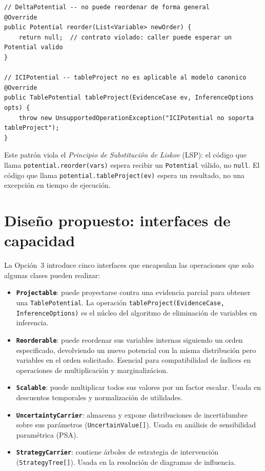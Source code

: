 \documentclass[11pt,a4paper]{article}
\newcommand{\code}[1]{\texttt{#1}}
\begin{document}
\begin{lstlisting}[caption={Implementación forzada en subclases que no pueden reordenar}]
// DeltaPotential -- no puede reordenar de forma general
@Override
public Potential reorder(List<Variable> newOrder) {
    return null;  // contrato violado: caller puede esperar un Potential valido
}

// ICIPotential -- tableProject no es aplicable al modelo canonico
@Override
public TablePotential tableProject(EvidenceCase ev, InferenceOptions opts) {
    throw new UnsupportedOperationException("ICIPotential no soporta tableProject");
}
\end{lstlisting}

Este patrón viola el \emph{Principio de Substitución de Liskov} (LSP): el
código que llama \code{potential.reorder(vars)} espera recibir un \code{Potential}
válido, no \code{null}.  El código que llama \code{potential.tableProject(ev)}
espera un resultado, no una excepción en tiempo de ejecución.

\section{Diseño propuesto: interfaces de capacidad}
\label{sec:op3-propuesta}

La Opción~3 introduce cinco interfaces que encapsulan las operaciones que solo
algunas clases pueden realizar:

\begin{itemize}
  \item \textbf{\code{Projectable}}: puede proyectarse contra una evidencia
        parcial para obtener una \code{TablePotential}.  La operación
        \code{tableProject(EvidenceCase, InferenceOptions)} es el núcleo del
        algoritmo de eliminación de variables en inferencia.

  \item \textbf{\code{Reorderable}}: puede reordenar sus variables internas
        siguiendo un orden especificado, devolviendo un nuevo potencial con la
        misma distribución pero variables en el orden solicitado.  Esencial
        para compatibilidad de índices en operaciones de multiplicación y
        marginalizácion.

  \item \textbf{\code{Scalable}}: puede multiplicar todos sus valores por un
        factor escalar.  Usada en descuentos temporales y normalización de
        utilidades.

  \item \textbf{\code{UncertaintyCarrier}}: almacena y expone distribuciones
        de incertidumbre sobre sus parámetros (\code{UncertainValue[]}).
        Usada en análisis de sensibilidad paramétrica (PSA).

  \item \textbf{\code{StrategyCarrier}}: contiene árboles de estrategia de
        intervención (\code{StrategyTree[]}).  Usada en la resolución de
        diagramas de influencia.
\end{itemize}
\end{document}
